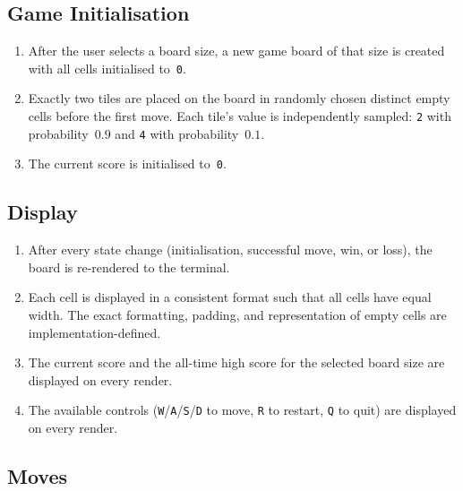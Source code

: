 \documentclass{article} %
\begin{document}
\subsection{Game Initialisation}

\begin{enumerate}[resume]

	\item After the user selects a board size,
	      a new game board of that size is created with all cells initialised to~\texttt{0}.

	\item Exactly two tiles are placed on the board in randomly chosen distinct empty cells
	      before the first move.
	      Each tile's value is independently sampled:
	      \texttt{2} with probability~$0.9$ and \texttt{4} with probability~$0.1$.

	\item The current score is initialised to~\texttt{0}.

\end{enumerate}

\subsection{Display}

\begin{enumerate}[resume]

	\item After every state change (initialisation, successful move, win, or loss),
	      the board is re-rendered to the terminal.

	\item Each cell is displayed in a consistent format such that all cells have equal width.
	      The exact formatting, padding, and representation of empty cells are implementation-defined.

	\item The current score and the all-time high score for the selected board size
	      are displayed on every render.

	\item The available controls (\texttt{W}/\texttt{A}/\texttt{S}/\texttt{D} to move,
	      \texttt{R} to restart, \texttt{Q} to quit) are displayed on every render.

\end{enumerate}

\subsection{Moves}
\end{document}
